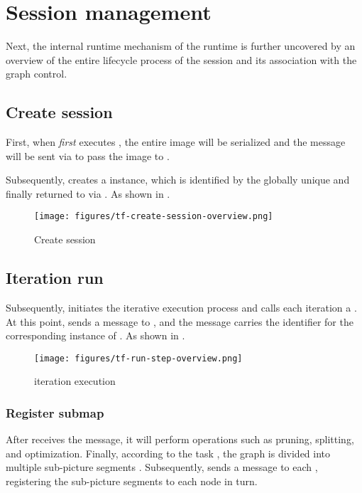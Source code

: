 \section{Session management}
\begin{content}
Next, the internal runtime mechanism of the runtime is further uncovered by an overview of the entire lifecycle process of the session and its association with the graph control.


\subsection{Create session}
First, when \emph{first} executes , the entire image will be serialized and the  message will be sent via  to pass the image to .

Subsequently,  creates a  instance, which is identified by the globally unique  and finally returned to  via . As shown in .

\begin{figure}[!h]
  \centering
  \texttt{[image: figures/tf-create-session-overview.png]}
  \caption{Create session}
  \label{fig:tf-create-session-overview}
\end{figure}


\subsection{Iteration run}
Subsequently,  initiates the iterative execution process and calls each iteration a . At this point,  sends a  message to , and the message carries the  identifier for the corresponding  instance of . As shown in .

\begin{figure}[!h]
  \centering
  \texttt{[image: figures/tf-run-step-overview.png]}
  \caption{iteration execution}
  \label{fig:tf-run-step-overview}
\end{figure}


\subsubsection{Register submap}
After  receives the  message, it will perform operations such as pruning, splitting, and optimization. Finally, according to the task , the graph is divided into multiple sub-picture segments . Subsequently,  sends a  message to each , registering the sub-picture segments to each  node in turn.


\end{content}
